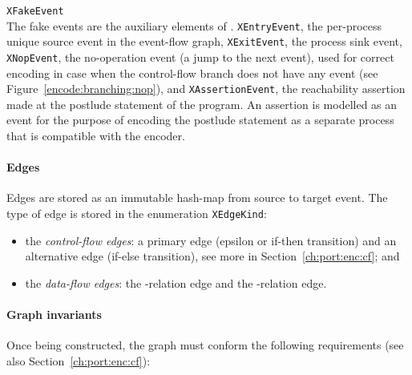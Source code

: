 \begin{outline}
  \1 \texttt{XFakeEvent} \\
    The fake events are the auxiliary elements of \xgraph{}.
    \2 \texttt{XEntryEvent}, the per-process unique source event in the event-flow graph,
    \2 \texttt{XExitEvent}, the process sink event,
    \2 \texttt{XNopEvent}, the no-operation event (a jump to the next event), used for correct encoding in case when the control-flow branch does not have any event (see Figure~\ref{encode:branching:nop}), and
    \2 \texttt{XAssertionEvent}, the reachability assertion made at the postlude statement of the program.
    An assertion is modelled as an event for the purpose of encoding the postlude statement as a separate process that is compatible with the encoder.
\end{outline}



\paragraph{Edges}
\label{ch:impl:model:xgraph:edges}
Edges are stored as an immutable hash-map from source to target event.
The type of edge is stored in the enumeration \texttt{XEdgeKind}:%
\begin{itemize}[noitemsep]
  \item the \textit{control-flow edges}: a primary edge (epsilon or if-then transition) and an alternative edge (if-else transition), see more in Section~\ref{ch:port:enc:cf}; and
  \item the \textit{data-flow edges}: the \co{}-relation edge and the \rf{}-relation edge. %
\end{itemize}


\paragraph{Graph invariants}
\label{ch:impl:model:xgraph:invariants}
Once being constructed, the graph must conform the following requirements (see also Section~\ref{ch:port:enc:cf}):

